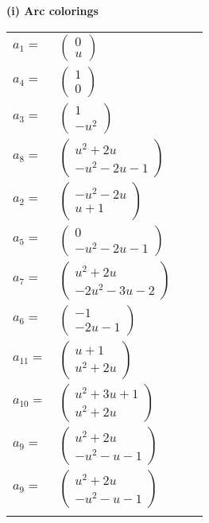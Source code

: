 \documentclass[1p]{elsarticle_modified}
\theoremstyle{definition}
\begin{document}
\flushleft \textbf{(i) Arc colorings}\\
\begin{tabular}{m{7pt} m{180pt} m{7pt} m{180pt} }
\flushright $a_{1}=$&$\begin{pmatrix}0\\u\end{pmatrix}$ \\
\flushright $a_{4}=$&$\begin{pmatrix}1\\0\end{pmatrix}$ \\
\flushright $a_{3}=$&$\begin{pmatrix}1\\- u^2\end{pmatrix}$ \\
\flushright $a_{8}=$&$\begin{pmatrix}u^2+2 u\\- u^2-2 u-1\end{pmatrix}$ \\
\flushright $a_{2}=$&$\begin{pmatrix}- u^2-2 u\\u+1\end{pmatrix}$ \\
\flushright $a_{5}=$&$\begin{pmatrix}0\\- u^2-2 u-1\end{pmatrix}$ \\
\flushright $a_{7}=$&$\begin{pmatrix}u^2+2 u\\-2 u^2-3 u-2\end{pmatrix}$ \\
\flushright $a_{6}=$&$\begin{pmatrix}-1\\-2 u-1\end{pmatrix}$ \\
\flushright $a_{11}=$&$\begin{pmatrix}u+1\\u^2+2 u\end{pmatrix}$ \\
\flushright $a_{10}=$&$\begin{pmatrix}u^2+3 u+1\\u^2+2 u\end{pmatrix}$ \\
\flushright $a_{9}=$&$\begin{pmatrix}u^2+2 u\\- u^2- u-1\end{pmatrix}$\\ \flushright $a_{9}=$&$\begin{pmatrix}u^2+2 u\\- u^2- u-1\end{pmatrix}$\\&\end{tabular}
\end{document}
